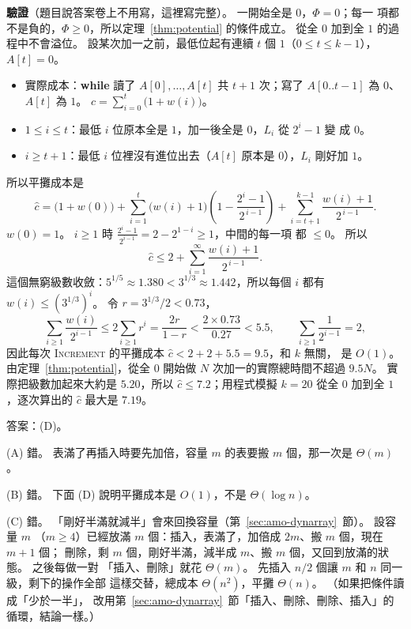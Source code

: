 \textbf{驗證}（題目說答案卷上不用寫，這裡寫完整）。 一開始全是 $0$，$\Phi = 0$；每一
項都不是負的，$\Phi \ge 0$，所以定理~\ref{thm:potential} 的條件成立。 從全 $0$ 加到全
$1$ 的過程中不會溢位。 設某次加一之前，最低位起有連續 $t$ 個 $1$（$0 \le t \le k -
1$），$A[t] = 0$。
\begin{itemize}
\item 實際成本：\textbf{while} 讀了 $A[0], \ldots, A[t]$ 共 $t + 1$ 次；寫了
$A[0..t-1]$ 為 $0$、$A[t]$ 為 $1$。 $c = \sum_{i=0}^{t} \bigl(1 + w(i)\bigr)$。
\item $1 \le i \le t$：最低 $i$ 位原本全是 $1$，加一後全是 $0$，$L_i$ 從 $2^i - 1$ 變
成 $0$。
\item $i \ge t + 1$：最低 $i$ 位裡沒有進位出去（$A[t]$ 原本是 $0$），$L_i$ 剛好加 $1$。
\end{itemize}
所以平攤成本是
\[
\hat{c} = \bigl(1 + w(0)\bigr)
+ \sum_{i=1}^{t} \bigl(w(i) + 1\bigr)\left(1 - \frac{2^i - 1}{2^{\,i-1}}\right)
+ \sum_{i=t+1}^{k-1} \frac{w(i) + 1}{2^{\,i-1}} .
\]
$w(0) = 1$。 $i \ge 1$ 時 $\frac{2^i - 1}{2^{i-1}} = 2 - 2^{1-i} \ge 1$，中間的每一項
都 $\le 0$。 所以
\[
\hat{c} \le 2 + \sum_{i=1}^{\infty} \frac{w(i) + 1}{2^{\,i-1}} .
\]
這個無窮級數收斂：$5^{1/5} \approx 1.380 < 3^{1/3} \approx 1.442$，所以每個 $i$ 都有
$w(i) \le (3^{1/3})^i$。 令 $r = 3^{1/3}/2 < 0.73$，
\[
\sum_{i \ge 1} \frac{w(i)}{2^{i-1}} \le 2 \sum_{i \ge 1} r^i = \frac{2r}{1 - r}
< \frac{2 \times 0.73}{0.27} < 5.5, \qquad \sum_{i \ge 1} \frac{1}{2^{i-1}} = 2 ,
\]
因此每次 \textsc{Increment} 的平攤成本 $\hat{c} < 2 + 2 + 5.5 = 9.5$，和 $k$ 無關，
是 $O(1)$。 由定理~\ref{thm:potential}，從全 $0$ 開始做 $N$ 次加一的實際總時間不超過
$9.5N$。 實際把級數加起來大約是 $5.20$，所以 $\hat{c} \le 7.2$；用程式模擬 $k = 20$
從全 $0$ 加到全 $1$，逐次算出的 $\hat{c}$ 最大是 $7.19$。

答案：(D)。

(A) 錯。 表滿了再插入時要先加倍，容量 $m$ 的表要搬 $m$ 個，那一次是 $\Theta(m)$。

(B) 錯。 下面 (D) 說明平攤成本是 $O(1)$，不是 $\Theta(\log n)$。

(C) 錯。 「剛好半滿就減半」會來回換容量（第~\ref{sec:amo-dynarray}~節）。 設容量 $m$
（$m \ge 4$）已經放滿 $m$ 個：插入，表滿了，加倍成 $2m$、搬 $m$ 個，現在 $m + 1$ 個；
刪除，剩 $m$ 個，剛好半滿，減半成 $m$、搬 $m$ 個，又回到放滿的狀態。 之後每做一對
「插入、刪除」就花 $\Theta(m)$。 先插入 $n/2$ 個讓 $m$ 和 $n$ 同一級，剩下的操作全部
這樣交替，總成本 $\Theta(n^2)$，平攤 $\Theta(n)$。 （如果把條件讀成「少於一半」，
改用第~\ref{sec:amo-dynarray}~節「插入、刪除、刪除、插入」的循環，結論一樣。）

